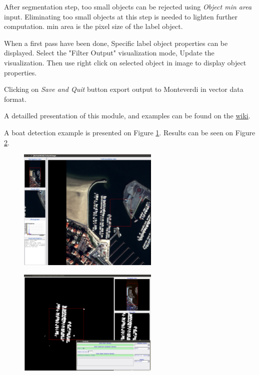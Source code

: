 After segmentation step, too small objects can be rejected using \emph{Object min area} input. Eliminating too small objects at this step is needed to lighten further computation. min area is the pixel size of the label object. 

When a first pass have been done, Specific label object properties can be displayed. Select the "Filter Output" visualization mode, Update the visualization. Then use right click on selected object in image to display object properties.

Clicking on \emph{Save and Quit} button export output to Monteverdi in vector data format.
 
A detailled presentation of this module, and examples can be found on the \href{http://wiki.orfeo-toolbox.org/index.php/Connected_component_segmentation_module}{wiki}.

A boat detection example is presented on Figure \ref{fig:boat detection}. Results can be seen on Figure \ref{fig:boat detection result}. 

\begin{figure}
  \center
  \includegraphics[width=0.6\textwidth]{../Art/MonteverdiImages/monteverdi_Capture_Boats.png}
  \label{fig:boat detection}
\end{figure}

\begin{figure}
  \center
  \includegraphics[width=0.6\textwidth]{../Art/MonteverdiImages/monteverdi_Capture_Boats_CC.png}
  \label{fig:boat detection result}
\end{figure}




